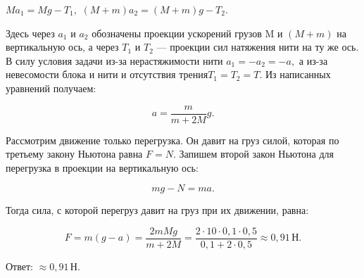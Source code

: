 \documentclass[12pt,a4paper]{article}
\begin{document}
{$Ma_1=Mg - T_1,$ $( M + m ) a_2= ( M + m ) g - T_2.$

Здесь через $a_1$ и $a_2$ обозначены проекции ускорений грузов M и $( M + m )$ на вертикальную ось, а через $T_1$ и $T_2$  — проекции сил натяжения нити на ту же ось.
В силу условия задачи из-за нерастяжимости нити $a_1= - a_2= - a,$ а из-за невесомости блока и нити и отсутствия трения$T_1=T_2=T.$ 
Из написанных уравнений получаем: 

\[a= \frac{m}{m + 2M} g.\]

Рассмотрим движение только перегрузка. Он давит на груз силой, которая по третьему закону Ньютона равна $F=N.$ Запишем второй закон Ньютона для перегрузка в проекции на вертикальную ось:

\[mg - N=ma.\]

Тогда сила, с которой перегруз давит на груз при их движении, равна:

\[F=m ( g - a ) = \frac{2mMg}{m + 2M} = \frac{2 \cdot 10 \cdot 0{,}1 \cdot 0{,}5}{0{,}1 + 2 \cdot 0{,}5} \approx 0{,}91\,\text{Н}.\]

Ответ: $\approx 0{,}91\,\text{Н}.$
}
\end{document}
